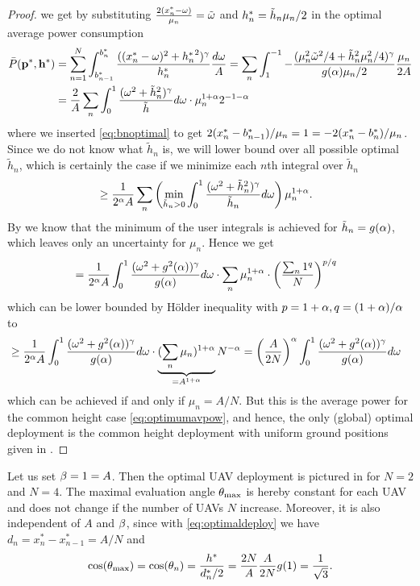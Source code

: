 \documentclass[smallabstract,smallcaptions]{dccpaper}
\newcommand{\Pbar}{\ensuremath{\bar{P}}}         %
\begin{document}
\begin{proof}
  we get by substituting $\frac{2(x_n^*-\omega)}{\mu_n}={  \tilde{\omega} }$ and $h^{*}_n=\tilde{h}_n\mu_n/2$  in the optimal average power
  consumption
  \begin{align}
    \Pbar(\vp^*,\vh^*)&=\sum_{n=1}^N \int_{b_{n-1}^*}^{b_n^*} \frac{ ((\pGlob_n-\ome)^2+{\hGlob_n}^2)^{\gam}}{\hGlob_n}\frac{d\ome}{A} 
    = \sum_n \int_{1}^{-1} -\frac{  (\mu_n^2 \tome^2/4 + \tilde{h}_n^2\mu_n^2/4)^{\gam}}{g(\alp)\mu_n/2}
    \frac{\mu_n}{2A}\notag\\
    &=\frac{2}{A}\sum_n \int_0^1 \frac{(\ome^2+\tilde{h}^2_n)^{\gam}}{\tilde{h}}d \ome \cdot \mu_n^{1+\alp} 2^{-1-\alp}
  \end{align}
  where we inserted \eqref{eq:bnoptimal} to get $2(x^{*}_n-b_{n-1}^*)/\mu_n=1=-2(x^{*}_n-b_{n}^*)/\mu_n$.
  Since we do not know what $\tilde{h}_n$ is, we will lower bound over all possible optimal $\tilde{h}_n$, which is
  certainly the case if we minimize each $n$th integral over $\tilde{h}_n$
  \begin{align}
    &\geq\frac{1}{2^{\alpha}A}\sum_n \left(\min_{\tilde{h}_n>0}\int_0^1 \frac{(\omega^2+\tilde{h}^2_n)^{\gamma}}{\tilde{h}_n}d \omega\right)
    \mu_n^{1+\alpha}.
\end{align}
%
By  we know that the minimum of the user integrals is  achieved for $\tilde{h}_n=g(\alpha)$, which leaves
only an uncertainty for $\mu_n$. Hence we get
%
\begin{align}
  &=\frac{1}{2^{\alpha}A} \int_0^1 \frac{(\omega^2+g^2(\alpha))^{\gamma}}{g(\alpha)}d\omega\cdot \sum_n \mu_n^{1+\alpha}\cdot \left(\frac{\sum_n
  1^q}{N}\right)^{p/q}
\end{align}
%
which can be lower bounded by Hölder inequality with $p=1+\alpha, q=(1+\alpha)/\alpha$ to
%
\begin{align}
  &\geq\frac{1}{2^{\alpha}A} 
  \int_0^1 \frac{(\omega^2+g^2(\alpha))^{\gamma}}{g(\alpha)}d\omega\cdot\underbrace{ (\sum_n
    \mu_n)^{1+\alpha}}_{=A^{1+\alpha}} N^{-\alpha}
    =  \left(\frac{A}{2N}\right)^{\alpha}  \int_0^1 \frac{(\omega^2+g^2(\alpha))^{\gamma}}{g(\alpha)}d\omega\notag
\end{align}
%
which can be achieved if and only if $\mu_n=A/N$. But this is the average power for the common height case
\eqref{eq:optimumavpow}, and hence, the only (global) optimal deployment is  the common height deployment with uniform
ground positions given in . 
%
\end{proof}
\fi %
\color{black}

Let us set $\beta=1=A$. Then the optimal UAV deployment is pictured in  for $N=2$ and $N=4$. The
maximal evaluation angle $\theta_{\text{max}}$ is hereby constant for each UAV and does not change if the number of UAVs
$N$ increase.
Moreover, it is also independent of $A$ and $\beta$, since with \eqref{eq:optimaldeploy} we have
$d_n=x^*_n-x^*_{n-1}=A/N$ and
%
\begin{align}
  \cos(\theta_{\text{max}})=\cos(\theta_n)= \frac{h^*}{d^*_n/2}= \frac{2N}{A}\frac{A}{2N}   g(1)= \frac{1}{\sqrt{3}}.
\end{align}
\end{document}
